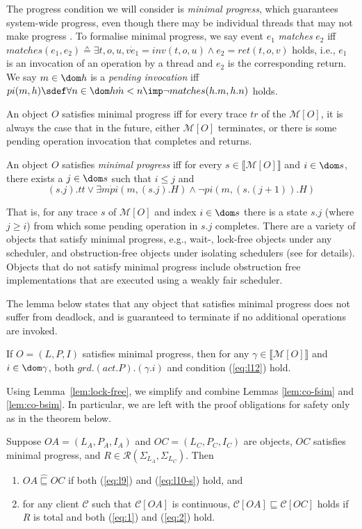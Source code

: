\documentclass[11pt]{llncs}
\def \ttvar{tt}
\def \all  {\forall}
\def \sref  {\sqsubseteq}
\def \srefc  {\mathbin{\widehat{\sqsubseteq}}}
\newcommand{\mcC}{\mathcal{C}}
\newcommand{\mcR}{\mathcal{R}}
\newcommand{\MGC}{\mathcal{M}}
\newcommand{\refeqn}[1]{(\ref{#1})}
\newcommand{\reflem}[1]{Lem\-ma~\ref{#1}}
\newcommand{\invoke}[3]{inv(#1, #2, #3)}
\newcommand{\return}[3]{ret(#1, #2, #3)}
\begin{document}
The progress condition we will consider is \emph{minimal progress},
which guarantees system-wide progress, even though there may be
individual threads that may not make progress \cite{HS11}. To formalise minimal progress, we say event $e_1$ \emph{matches} $e_2$
iff $matches(e_1, e_2) \sdef \exists t, o, u, v \dot e_1 =
\invoke{t}{o}{u} \land e_2 =\return{t}{o}{v}$
holds, i.e., $e_1$ is an invocation of an operation by a thread and
$e_2$ is the corresponding return. We say $m \in \dom h$ is a
\emph{pending invocation} iff
$pi(m,h) \sdef \all n \in \dom h \dot m < n \imp \neg matches(h.m,
h.n)$ holds.

An object $O$ satisfies minimal progress iff for every trace $tr$ of
the $\MGC[O]$, it is always the case that in the future, either
$\MGC[O]$ terminates, or there is some pending operation invocation
that completes and returns. \begin{definition}
  An object $O$ satisfies \emph{minimal progress} iff for every
  $s \in \llbracket \MGC[O] \rrbracket$ and $i \in \dom s$, there
  exists a $j \in \dom s$ such that $i \le j$ and
  $$(s.j).\ttvar \lor \exists m \dot pi(m, (s.j).H) \land \neg pi(m,
  (s.(j+1)).H)$$
\end{definition}
That is, for any trace $s$ of $\MGC[O]$ and index $i \in \dom s$ there
is a state $s.j$ (where $j \ge i$) from which some pending operation
in $s.j$ completes. There are a variety of objects that satisfy
minimal progress, e.g., wait-, lock-free objects under any scheduler,
and obstruction-free objects under isolating schedulers (see
\cite{HS11} for details). Objects that do not satisfy minimal progress
include obstruction free implementations that are executed using a
weakly fair scheduler.


The lemma below states that any object that satisfies minimal progress
does not suffer from deadlock, and is guaranteed to terminate if no
additional operations are invoked.
\begin{lemma}
  \label{lem:lock-free}
  If $O = (L, P, I)$ satisfies minimal progress, then for any
  $\gamma \in \llbracket \MGC[O] \rrbracket$ and $i \in \dom \gamma$,
  both $grd.(act.P).(\gamma.i)$ and
  condition \refeqn{eq:l12} hold.
\end{lemma}
Using \reflem{lem:lock-free}, we simplify and combine Lemmas
\ref{lem:co-fsim} and \ref{lem:co-bsim}. In particular, we are left
with the proof obligations for safety only as in the theorem below.
\begin{theorem}
  \label{thm:co-safety}  
  Suppose $OA = (L_A, P_A, I_A)$ and $OC = (L_C, P_C, I_C)$ are
  objects, $OC$ satisfies minimal progress, and $R \in
  \mcR(\Sigma_{L_A}, \Sigma_{L_C})$. Then\vspace{-2mm}
  \begin{enumerate}
  \item $OA \srefc OC$ if both \refeqn{eq:l9} and \refeqn{eq:l10-s}
    hold, and
  \item for any client $\mcC$ such that $\mcC[OA]$ is continuous,
    $\mcC[OA] \sref \mcC[OC]$ holds if $R$ is total and both
    \refeqn{eq:1} and \refeqn{eq:2} hold.
  \end{enumerate}
\end{theorem}
\vspace{-2mm}
\end{document}

